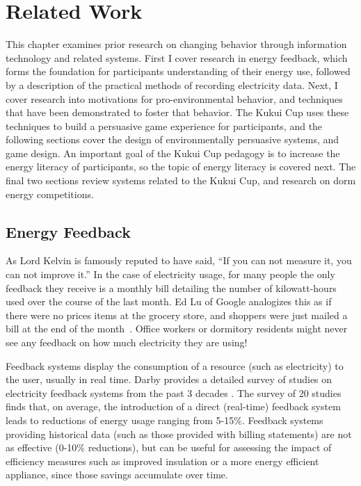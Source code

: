 \chapter{Related Work}
\label{cha:related-work}

This chapter examines prior research on changing behavior through information technology and related systems. First I cover research in energy feedback, which forms the foundation for participants understanding of their energy use, followed by a description of the practical methods of recording electricity data. Next, I cover research into motivations for pro-environmental behavior, and techniques that have been demonstrated to foster that behavior. The Kukui Cup uses these techniques to build a persuasive game experience for participants, and the following sections cover the design of environmentally persuasive systems, and game design. An important goal of the Kukui Cup pedagogy is to increase the energy literacy of participants, so the topic of energy literacy is covered next. The final two sections review systems related to the Kukui Cup, and research on dorm energy competitions.


\section{Energy Feedback}
\label{sec:energy-feedback}

As Lord Kelvin is famously reputed to have said, ``If you can not measure it, you can not improve it.'' In the case of electricity usage, for many people the only feedback they receive is a monthly bill detailing the number of kilowatt-hours used over the course of the last month. Ed Lu of Google analogizes this as if there were no prices items at the grocery store, and shoppers were just mailed a bill at the end of the month~\cite{Helft2008Googles-Energy}. Office workers or dormitory residents might never see any feedback on how much electricity they are using!

Feedback systems display the consumption of a resource (such as electricity) to the user, usually in real time. Darby provides a detailed survey of studies on electricity feedback systems from the past 3 decades \cite{darby-review-2006}. The survey of 20 studies finds that, on average, the introduction of a direct (real-time) feedback system leads to reductions of energy usage ranging from 5-15\%. Feedback systems providing historical data (such as those provided with billing statements) are not as effective (0-10\% reductions), but can be useful for assessing the impact of efficiency measures such as improved insulation or a more energy efficient appliance, since those savings accumulate over time.

